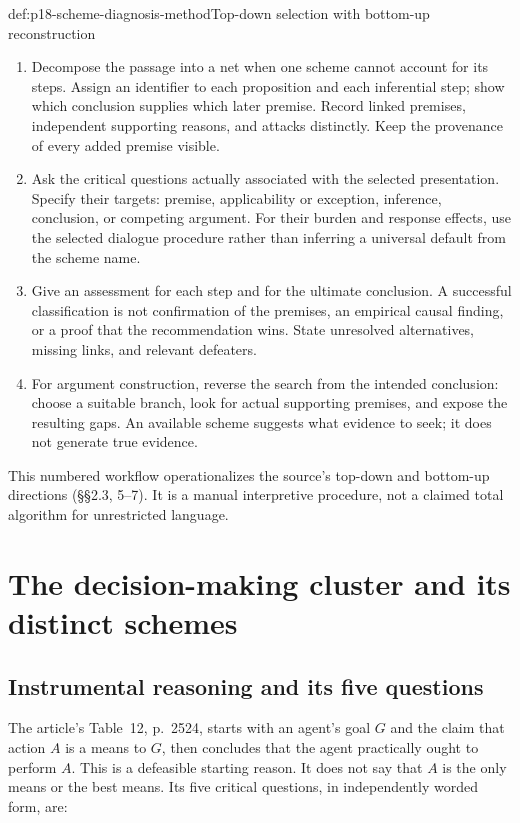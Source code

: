 \begin{hbmethod}{def:p18-scheme-diagnosis-method}{Top-down selection with bottom-up reconstruction}
\begin{enumerate}
variant, a component supporting a premise, or a counterargument?
These relations answer different questions and should not share one
undifferentiated arrow.
\item Decompose the passage into a net when one scheme cannot account
for its steps. Assign an identifier to each proposition and each
inferential step; show which conclusion supplies which later premise.
Record linked premises, independent supporting reasons, and attacks
distinctly. Keep the provenance of every added premise visible.
\item Ask the critical questions actually associated with the selected
presentation. Specify their targets: premise, applicability or
exception, inference, conclusion, or competing argument.
For their burden and response effects, use the selected dialogue
procedure rather than inferring a universal default from the scheme name.
\item Give an assessment for each step and for the ultimate conclusion.
A successful classification is not confirmation of the premises,
an empirical causal finding, or a proof that the recommendation wins.
State unresolved alternatives, missing links, and relevant defeaters.
\item For argument construction, reverse the search from the intended
conclusion: choose a suitable branch, look for actual supporting
premises, and expose the resulting gaps. An available scheme suggests
what evidence to seek; it does not generate true evidence.
\end{enumerate}
This numbered workflow operationalizes the source's top-down and
bottom-up directions (\S\S2.3, 5--7). It is a manual interpretive
procedure, not a claimed total algorithm for unrestricted language.
\end{hbmethod}

\section{The decision-making cluster and its distinct schemes}
\label{sec:p18-scheme-practical-cluster}

\subsection{Instrumental reasoning and its five questions}

The article's Table~12, p.~2524, starts with an agent's goal \(G\)
and the claim that action \(A\) is a means to \(G\), then concludes
that the agent practically ought to perform \(A\).
This is a defeasible starting reason. It does not say that \(A\)
is the only means or the best means.
Its five critical questions, in independently worded form, are:

